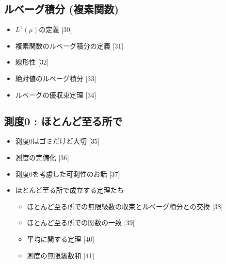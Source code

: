 \documentclass[a4paper,18pt]{jsarticle}
\begin{document}
\subsection{ルベーグ積分 (複素関数)}
\begin{itemize}
  \item $L^1(\mu)$の定義 [30]
  \item 複素関数のルベーグ積分の定義 [31]
  \item 線形性 [32]
  \item 絶対値のルベーグ積分 [33]
  \item ルベーグの優収束定理 [34]
\end{itemize}

\subsection{測度0 : ほとんど至る所で}
\begin{itemize}
  \item 測度0はゴミだけど大切 [35]
  \item 測度の完備化 [36]
  \item 測度0を考慮した可測性のお話 [37]
  \item ほとんど至る所で成立する定理たち
  \begin{itemize}
    \item ほとんど至る所での無限級数の収束とルベーグ積分との交換 [38]
    \item ほとんど至る所での関数の一致 [39]
    \item 平均に関する定理 [40]
    \item 測度の無限級数和 [41]
  \end{itemize}
\end{itemize}
\end{document}
